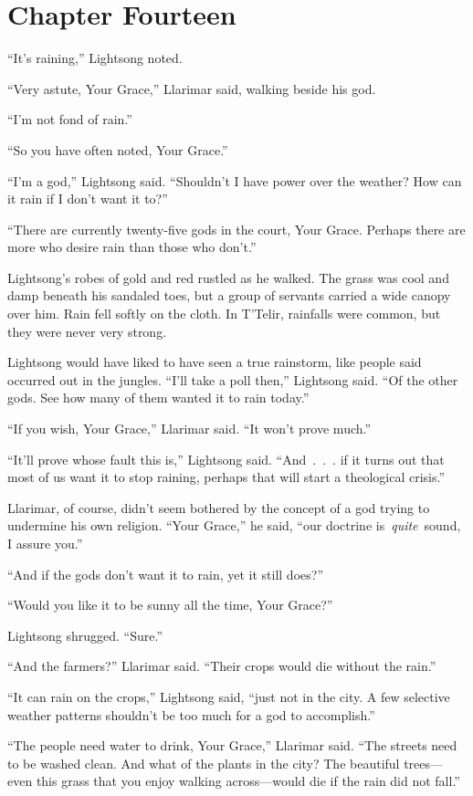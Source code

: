 \section{Chapter Fourteen}

“It’s raining,” Lightsong noted.

“Very astute, Your Grace,” Llarimar said, walking beside his god.

“I’m not fond of rain.”

“So you have often noted, Your Grace.”

“I’m a god,” Lightsong said. “Shouldn’t I have power over the weather? How can it rain if I don’t want it to?”

“There are currently twenty-five gods in the court, Your Grace. Perhaps there are more who desire rain than those who don’t.”

Lightsong’s robes of gold and red rustled as he walked. The grass was cool and damp beneath his sandaled toes, but a group of servants carried a wide canopy over him. Rain fell softly on the cloth. In T’Telir, rainfalls were common, but they were never very strong.

Lightsong would have liked to have seen a true rainstorm, like people said occurred out in the jungles. “I’ll take a poll then,” Lightsong said. “Of the other gods. See how many of them wanted it to rain today.”

“If you wish, Your Grace,” Llarimar said. “It won’t prove much.”

“It’ll prove whose fault this is,” Lightsong said. “And~.~.~. if it turns out that most of us want it to stop raining, perhaps that will start a theological crisis.”

Llarimar, of course, didn’t seem bothered by the concept of a god trying to undermine his own religion. “Your Grace,” he said, “our doctrine is~\textit{quite}~sound, I assure you.”

“And if the gods don’t want it to rain, yet it still does?”

“Would you like it to be sunny all the time, Your Grace?”

Lightsong shrugged. “Sure.”

“And the farmers?” Llarimar said. “Their crops would die without the rain.”

“It can rain on the crops,” Lightsong said, “just not in the city. A few selective weather patterns shouldn’t be too much for a god to accomplish.”

“The people need water to drink, Your Grace,” Llarimar said. “The streets need to be washed clean. And what of the plants in the city? The beautiful trees—even this grass that you enjoy walking across—would die if the rain did not fall.”

